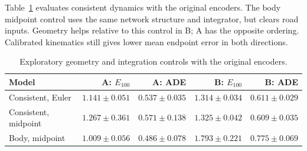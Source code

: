 \documentclass[preprint,12pt]{elsarticle}
\begin{document}
Table~\ref{tab:geometry} evaluates consistent dynamics with the original encoders.
The body midpoint control uses the same network structure and integrator, but
clears road inputs. Geometry helps relative to this control in B; A has the
opposite ordering. Calibrated kinematics still gives lower mean endpoint error
in both directions.
\begin{table}[t]
\centering
\caption{Exploratory geometry and integration controls with the original encoders.}
\label{tab:geometry}
\footnotesize
\setlength{\tabcolsep}{3pt}
\begin{tabular}{lrrrr}
\toprule
Model & A: $E_{100}$ & A: ADE & B: $E_{100}$ & B: ADE \\
\midrule
Consistent, Euler & $1.141 \pm 0.051$ & $0.537 \pm 0.035$ & $1.314 \pm 0.034$ & $0.611 \pm 0.029$ \\
Consistent, midpoint & $1.267 \pm 0.361$ & $0.571 \pm 0.138$ & $1.325 \pm 0.042$ & $0.609 \pm 0.035$ \\
Body, midpoint & $1.009 \pm 0.056$ & $0.486 \pm 0.078$ & $1.793 \pm 0.221$ & $0.775 \pm 0.069$ \\
\bottomrule
\end{tabular}
\end{table}
\end{document}
